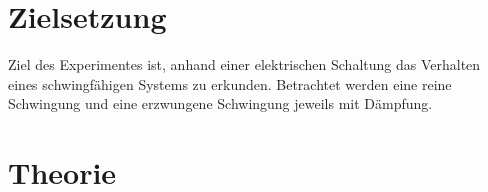 \section{Zielsetzung}
Ziel des Experimentes ist, anhand einer elektrischen Schaltung das Verhalten eines schwingfähigen Systems zu erkunden. 
Betrachtet werden eine reine Schwingung und eine erzwungene Schwingung jeweils mit Dämpfung.

\section{Theorie}
\label{sec:Theorie}
